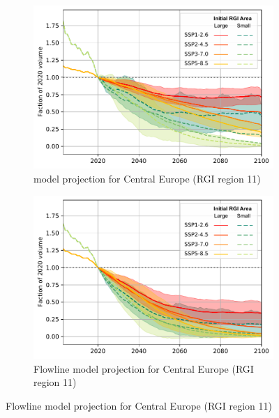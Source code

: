       \begin{figure}[htp]

          \begin{subfigure}[b]{0.476\textwidth}
              \caption{\Vas{} model projection for Central Europe (RGI region 11) }
              \label{fig:cmip:area_classes_reg_11}
              \centering
              \includegraphics[width=\textwidth]{../plots/final_plots/time_series/cmip/area_classes_vas_11.pdf}
          \end{subfigure}
          \hfill
          \begin{subfigure}[b]{0.476\textwidth}
              \caption{Flowline model projection for Central Europe (RGI region 11) }
              \label{fig:cmip:area_classes_11}
              \centering
              \includegraphics[width=\textwidth]{../plots/final_plots/time_series/cmip/area_classes_fl_11.pdf}
          \end{subfigure}


\end{figure}
